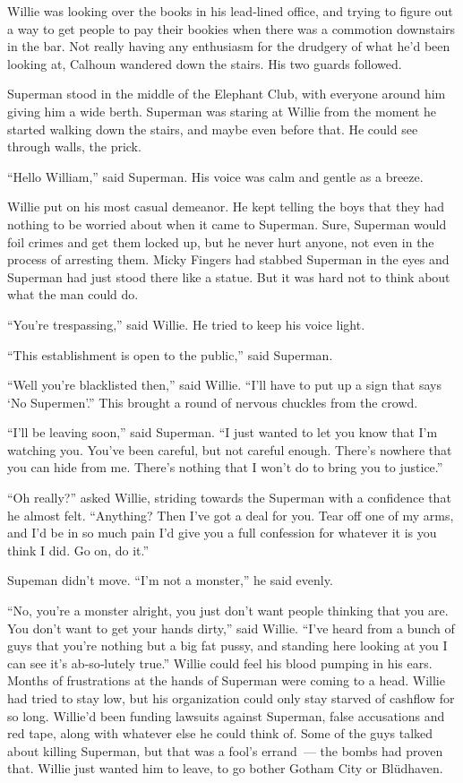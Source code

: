 Willie was looking over the books in his lead‐lined office, and trying
to figure out a way to get people to pay their bookies when there was a
commotion downstairs in the bar. Not really having any enthusiasm for
the drudgery of what he'd been looking at, Calhoun wandered down the
stairs. His two guards followed.

Superman stood in the middle of the Elephant Club, with everyone around
him giving him a wide berth. Superman was staring at Willie from the
moment he started walking down the stairs, and maybe even before that.
He could see through walls, the prick.

``Hello William,'' said Superman. His voice was calm and gentle as a
breeze.

Willie put on his most casual demeanor. He kept telling the boys that
they had nothing to be worried about when it came to Superman. Sure,
Superman would foil crimes and get them locked up, but he never hurt
anyone, not even in the process of arresting them. Micky Fingers had
stabbed Superman in the eyes and Superman had just stood there like a
statue. But it was hard not to think about what the man could do.

``You're trespassing,'' said Willie. He tried to keep his voice light.

``This establishment is open to the public,'' said Superman.

``Well you're blacklisted then,'' said Willie. ``I'll have to put up a
sign that says `No Supermen'.'' This brought a round of nervous chuckles
from the crowd.

``I'll be leaving soon,'' said Superman. ``I just wanted to let you know
that I'm watching you. You've been careful, but not careful enough.
There's nowhere that you can hide from me. There's nothing that I won't
do to bring you to justice.''

``Oh really?'' asked Willie, striding towards the Superman with a
confidence that he almost felt. ``Anything? Then I've got a deal for
you. Tear off one of my arms, and I'd be in so much pain I'd give you a
full confession for whatever it is you think I did. Go on, do it.''

Supeman didn't move. ``I'm not a monster,'' he said evenly.

``No, you're a monster alright, you just don't want people thinking that
you are. You don't want to get your hands dirty,'' said Willie. ``I've
heard from a bunch of guys that you're nothing but a big fat pussy, and
standing here looking at you I can see it's ab‐so‐lutely true.'' Willie
could feel his blood pumping in his ears. Months of frustrations at the
hands of Superman were coming to a head. Willie had tried to stay low,
but his organization could only stay starved of cashflow for so long.
Willie'd been funding lawsuits against Superman, false accusations and
red tape, along with whatever else he could think of. Some of the guys
talked about killing Superman, but that was a fool's errand~--- the
bombs had proven that. Willie just wanted him to leave, to go bother
Gotham City or Blüdhaven.

